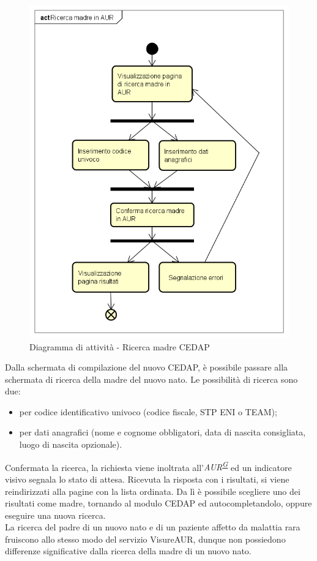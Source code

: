 \documentclass[a4paper]{article}
\newcounter{subsubsubsection}[subsubsection]
\begin{document}
\begin{figure}[H]
	\centering
	\includegraphics[width=0.4\linewidth]{uml/ricercamadreaur.png}
    \caption{Diagramma di attività - Ricerca madre CEDAP}
\end{figure}
Dalla schermata di compilazione del nuovo CEDAP, è possibile passare alla schermata di ricerca della madre del nuovo nato. Le possibilità di ricerca sono due:
\begin{itemize}
	\item per codice identificativo univoco (codice fiscale, STP ENI o TEAM);
    \item per dati anagrafici (nome e cognome obbligatori, data di nascita consigliata, luogo di nascita opzionale).
\end{itemize}
Confermata la ricerca, la richiesta viene inoltrata all'\textit{AUR\textsuperscript{\hyperref[sec:gl]{G}}} ed un indicatore visivo segnala lo stato di attesa. Ricevuta la risposta con i risultati, si viene reindirizzati alla pagine con la lista ordinata. Da lì è possibile scegliere uno dei risultati come madre, tornando al modulo CEDAP ed autocompletandolo, oppure eseguire una nuova ricerca.
\\
La ricerca del padre di un nuovo nato e di un paziente affetto da malattia rara fruiscono allo stesso modo del servizio VisureAUR, dunque non possiedono differenze significative dalla ricerca della madre di un nuovo nato.
\end{document}
